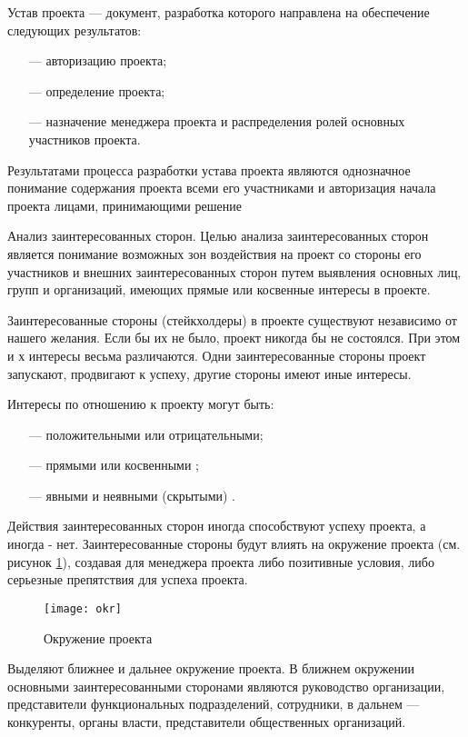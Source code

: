 Устав проекта --- документ, разработка которого направлена на обеспечение следующих результатов:
\begin{itemize}
	\item [---]авторизацию проекта;
\item [---]определение проекта;
\item [---]назначение менеджера проекта и распределения ролей основных участников проекта.
\end{itemize}

Результатами процесса разработки устава проекта являются однознач­ное понимание содержания проекта всеми его участниками и автори­зация начала проекта лицами, принимающими решение \cite[135--137]{polkovnikov}

Анализ заинтересованных сторон.
Целью анализа заинтересованных сторон является понимание возмож­ных зон воздействия на проект со стороны его участников и внешних заинтересованных сторон путем выявления основных лиц, групп и организаций, имеющих прямые или косвенные интересы в проекте.

Заинтересованные стороны (стейкхолдеры) в проекте существуют независимо от нашего желания.
Если бы их не было, проект никогда бы не состоялся.
При этом и х интересы весьма различаются.
Одни заинтересованные стороны проект запускают, продвигают к успеху, другие стороны имеют иные интересы.

Интересы по отношению к проекту могут быть:
\begin{itemize}
	\item [---]положительными или отрицательными;
	\item [---]прямыми или косвенными ;
	\item [---]явными и неявными (скрытыми) .
\end{itemize}

Действия заинтересованных сторон иногда способствуют успеху проекта, а иногда - нет.
Заинтересованные стороны будут влиять на окружение проекта (см. рисунок \ref{fig:okuzhenie}), создавая для менеджера проекта либо позитивные условия, либо серьезные препятствия для успеха проекта.

\begin{figure}[h]
	\centering
	\texttt{[image: okr]}
	\caption{Окружение проекта}
	\label{fig:okuzhenie}
\end{figure}

Выделяют ближнее и дальнее окружение проекта.
В ближнем окружении основными заинтересованными сторонами являются руко­водство организации, представители функциональных подразделений,
сотрудники, в дальнем --- конкуренты, органы власти, представители общественных организаций.

